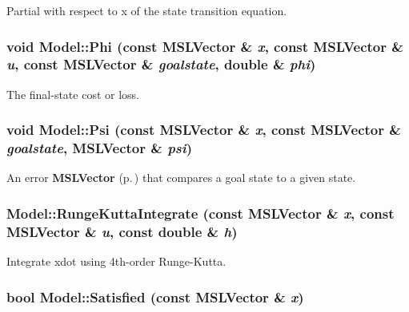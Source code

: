Partial with respect to x of the state transition equation.

\subsubsection{\setlength{\rightskip}{0pt plus 5cm}void Model::Phi (const {\bf MSLVector} \& {\em x}, const {\bf MSLVector} \& {\em u}, const {\bf MSLVector} \& {\em goalstate}, double \& {\em phi})\hspace{0.3cm}{\tt  [inline, virtual]}}\label{classModel_a15}


The final-state cost or loss.

\subsubsection{\setlength{\rightskip}{0pt plus 5cm}void Model::Psi (const {\bf MSLVector} \& {\em x}, const {\bf MSLVector} \& {\em goalstate}, {\bf MSLVector} \& {\em psi})\hspace{0.3cm}{\tt  [inline, virtual]}}\label{classModel_a18}


An error {\bf MSLVector} {\rm (p.\,\pageref{classMSLVector})} that compares a goal state to a given state.

\subsubsection{ Model::Runge\-Kutta\-Integrate (const {\bf MSLVector} \& {\em x}, const {\bf MSLVector} \& {\em u}, const double \& {\em h})\hspace{0.3cm}{\tt  [protected]}}\label{classModel_b0}


Integrate xdot using 4th-order Runge-Kutta.

\subsubsection{\setlength{\rightskip}{0pt plus 5cm}bool Model::Satisfied (const {\bf MSLVector} \& {\em x})\hspace{0.3cm}{\tt  [virtual]}}\label{classModel_a4}



